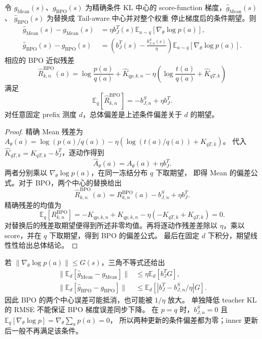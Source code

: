 \documentclass[lang=cn,scheme=chinese,openany]{../book/elegantbook}
\begin{document}
\begin{theorem}
\label{thm:ch2-ta-center-gradient-bias}
令 $g_{\mathrm{Mean}}(s)$、$g_{\mathrm{BPO}}(s)$ 为精确条件 KL 中心的 score-function 梯度，$\widehat g_{\mathrm{Mean}}(s)$、 $\widehat g_{\mathrm{BPO}}(s)$ 为替换成 Tail-aware 中心并对整个权重 停止梯度后的条件期望。则
\begin{align}
 \widehat g_{\mathrm{Mean}}(s)-g_{\mathrm{Mean}}(s)
 &=\eta b_J^T(s)\mathbb E_{a\sim q}[\nabla_\theta\log p(a)],\\
 \widehat g_{\mathrm{BPO}}(s)-g_{\mathrm{BPO}}(s)
 &=\left(b_J^T(s)-\frac{b_{J,n}^S(s)}{\eta}\right)
   \mathbb E_{a\sim q}[\nabla_\theta\log p(a)].
\end{align}
相应的 BPO 近似残差
\begin{equation}
 \widehat R_{k,n}^{\mathrm{BPO}}(a)
 =\log\frac{p(a)}{q(a)}+\widehat K_{qp,k,n}
 -\eta\left(\log\frac{t(a)}{q(a)}+\widehat K_{qT,k}\right)
\end{equation}
满足
\begin{equation}
 \mathbb E_q[\widehat R_{k,n}^{\mathrm{BPO}}]=-b_{J,n}^S+\eta b_J^T.
\end{equation}
对任意固定 prefix 测度 $d$，总体偏差是上述条件偏差关于 $d$ 的期望。
\end{theorem}

\begin{proof}
精确 Mean 残差为 $A_\theta(a)=\log(p(a)/q(a))-\eta(\log(t(a)/q(a))+K_{qT,k})$。 代入 $\widehat K_{qT,k}=K_{qT,k}-b_J^T$，逐动作得到
\begin{equation}
 \widehat A_\theta(a)=A_\theta(a)+\eta b_J^T.
\end{equation}
两者分别乘以 $\nabla_\theta\log p(a)$，在同一冻结分布 $q$ 下取期望， 即得 Mean 的偏差公式。对于 BPO，两个中心的替换给出
\begin{equation}
 \widehat R_{k,n}^{\mathrm{BPO}}(a)=R_{k,n}^{\mathrm{BPO}}(a)-b_{J,n}^S+\eta b_J^T.
\end{equation}
精确残差的均值为
\begin{equation}
 \mathbb E_q[R_{k,n}^{\mathrm{BPO}}]
 =-K_{qp,k,n}+K_{qp,k,n}
 -\eta(-K_{qT,k}+K_{qT,k})=0.
\end{equation}
对替换后的残差取期望便得到所述非零均值。再将逐动作残差差除以 $\eta$，乘以 score，并在 $q$ 下取期望，得到 BPO 的偏差公式。 最后在固定 $d$ 下积分，期望线性性给出总体结论。
\end{proof}

若 $\lVert\nabla_\theta\log p(a)\rVert\le G(s)$，三角不等式还给出
\begin{align}
 \lVert\mathbb E_d[\widehat g_{\mathrm{Mean}}-g_{\mathrm{Mean}}]\rVert
 &\le\eta\mathbb E_d[b_J^T G],\\
 \lVert\mathbb E_d[\widehat g_{\mathrm{BPO}}-g_{\mathrm{BPO}}]\rVert
 &\le\mathbb E_d[|b_J^T-b_{J,n}^S/\eta|G].
\end{align}
因此 BPO 的两个中心误差可能抵消，也可能被 $1/\eta$ 放大。 单独降低 teacher KL 的 RMSE 不能保证 BPO 梯度误差同步下降。 在 $p=q$ 时，$b_{J,n}^S=0$ 且 $\mathbb E_q[\nabla_\theta\log p]=\nabla_\theta\sum_a p(a)=0$， 所以两种更新的条件偏差都为零；inner 更新后一般不再满足该条件。
\end{document}
